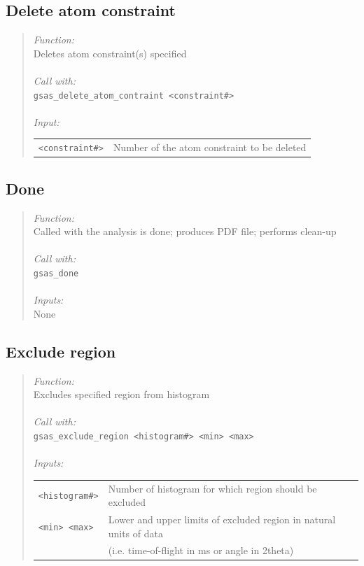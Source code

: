 \documentclass{article}
\begin{document}
\subsection{Delete atom constraint}
\begin{quote}
\textit{Function:} \\
Deletes atom constraint(s) specified \\ \\
\textit{Call with:}\\
\texttt{gsas\_delete\_atom\_contraint <constraint\#>} \\ \\
\textit{Input:}\\
\begin{tabular}[t]{l l}
\texttt{<constraint\#>} &  Number of the atom constraint to be deleted \\
\end{tabular}
\end{quote}

\subsection{Done}
\begin{quote}
\textit{Function:} \\
Called with the analysis is done; produces PDF file; performs clean-up  \\ \\
\textit{Call with:} \\
\texttt{gsas\_done} \\ \\
\textit{Inputs:}\\
None
\end{quote}

\subsection{Exclude region}
\begin{quote}
\textit{Function:}\\
Excludes specified region from histogram \\ \\
\textit{Call with:} \\
\texttt{gsas\_exclude\_region <histogram\#> <min> <max>} \\ \\
\textit{Inputs:} \\
\begin{tabular}[t]{l l}
\texttt{<histogram\#>} & Number of histogram for which region should be excluded \\
\texttt{<min> <max>} &  Lower and upper limits of excluded region in natural units of data \\
		& (i.e. time-of-flight in ms or angle in 2theta) \\
\end{tabular}
\end{quote}
\end{document}
